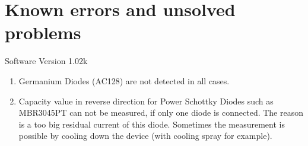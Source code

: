 
\chapter{Known errors and unsolved problems}
{\center Software Version 1.02k}

\begin{enumerate}

\item Germanium Diodes (AC128) are not detected in all cases.

\item Capacity value in reverse direction for Power Schottky Diodes such as MBR3045PT can not be measured,
if only one diode is connected. The reason is a too big residual current of this diode.
Sometimes the measurement is possible by cooling down the device (with  cooling spray for example).

\end{enumerate}
